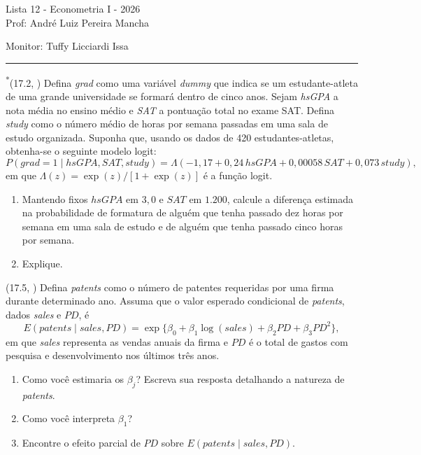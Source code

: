 \documentclass[12pt,letterpaper,onecolumn]{exam}
\begin{document}
\begingroup
    \centering
    \LARGE Lista 12 - Econometria I - 2026\\[0.5em]
    \large Prof: André Luiz Pereira Mancha \par
    \large Monitor: Tuffy Licciardi Issa \par
\endgroup
\rule{\textwidth}{0.4pt}
\pointsdroppedatright
\printanswers
\renewcommand{\solutiontitle}{\noindent\textbf{Ans:}\enspace}
\newcommand{\qstar}{\hspace{-0.6em}\textsuperscript{*}\hspace{0.2em}}

\begin{questions}

\question\qstar (17.2, \citep{wooldridge2016}) Defina \textit{grad} como uma variável \textit{dummy} que indica se um estudante-atleta de uma grande universidade se formará dentro de cinco anos. Sejam \textit{hsGPA} a nota média no ensino médio e \textit{SAT} a pontuação total no exame SAT. Defina \textit{study} como o número médio de horas por semana passadas em uma sala de estudo organizada. Suponha que, usando os dados de 420 estudantes-atletas, obtenha-se o seguinte modelo logit:
\[
P(grad = 1 \mid hsGPA, SAT, study)
=
\Lambda(-1{,}17 + 0{,}24\,hsGPA + 0{,}00058\,SAT + 0{,}073\,study),
\]
em que \(\Lambda(z)=\exp(z)/[1+\exp(z)]\) é a função logit.
\begin{enumerate}[label=(\roman*)]
    \item Mantendo fixos \(hsGPA\) em \(3{,}0\) e \(SAT\) em \(1.200\), calcule a diferença estimada na probabilidade de formatura de alguém que tenha passado dez horas por semana em uma sala de estudo e de alguém que tenha passado cinco horas por semana.
    \item Explique.
\end{enumerate}

\vspace{0.7cm}

\question (17.5, \citep{wooldridge2016}) Defina \textit{patents} como o número de patentes requeridas por uma firma durante determinado ano. Assuma que o valor esperado condicional de \textit{patents}, dados \textit{sales} e \(PD\), é
\[
E(patents \mid sales,PD)=\exp\{\beta_0+\beta_1\log(sales)+\beta_2 PD+\beta_3 PD^2\},
\]
em que \textit{sales} representa as vendas anuais da firma e \(PD\) é o total de gastos com pesquisa e desenvolvimento nos últimos três anos.
\begin{enumerate}[label=(\roman*)]
    \item Como você estimaria os \(\beta_j\)? Escreva sua resposta detalhando a natureza de \textit{patents}.
    \item Como você interpreta \(\beta_1\)?
    \item Encontre o efeito parcial de \(PD\) sobre \(E(patents \mid sales,PD)\).
\end{enumerate}


\end{questions}
\end{document}

